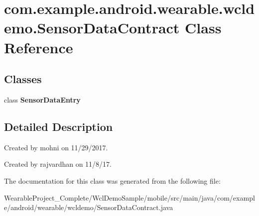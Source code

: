 \hypertarget{classcom_1_1example_1_1android_1_1wearable_1_1wcldemo_1_1SensorDataContract}{}\section{com.\+example.\+android.\+wearable.\+wcldemo.\+Sensor\+Data\+Contract Class Reference}
\label{classcom_1_1example_1_1android_1_1wearable_1_1wcldemo_1_1SensorDataContract}
\subsection*{Classes}
\begin{DoxyCompactItemize}
\item 
class {\bfseries Sensor\+Data\+Entry}
\end{DoxyCompactItemize}


\subsection{Detailed Description}
Created by mohni on 11/29/2017.

Created by rajvardhan on 11/8/17. 

The documentation for this class was generated from the following file\+:\begin{DoxyCompactItemize}
\item 
Wearable\+Project\+\_\+\+Complete/\+Wcl\+Demo\+Sample/mobile/src/main/java/com/example/android/wearable/wcldemo/Sensor\+Data\+Contract.\+java\end{DoxyCompactItemize}
